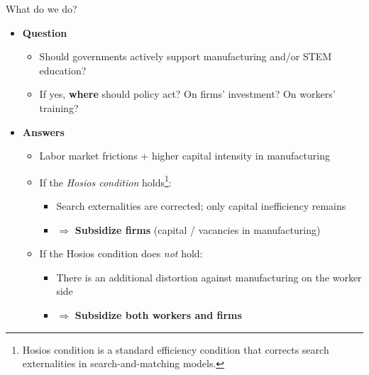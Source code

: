 \documentclass[9pt,xcolor={svgnames}]{beamer}
\begin{document}
\begin{frame}{What do we do?}
\begin{itemize}
  \item \textbf{Question}
  \begin{itemize}
      \item Should governments actively support manufacturing and/or STEM education?
      \item If yes, \textbf{where} should policy act? On firms’ investment? On workers’ training?
  \end{itemize}
  \vspace{2em}
  \item \textbf{Answers}
    \begin{itemize}
      \item Labor market frictions + higher capital intensity in manufacturing 
      \item If the \textit{Hosios condition} holds\footnote{Hosios condition is a standard efficiency condition that corrects search externalities in search-and-matching models.}:
      \begin{itemize}
          \item Search externalities are corrected; only capital inefficiency remains
          \item $\Rightarrow$ \textbf{Subsidize firms} (capital / vacancies in manufacturing)
      \end{itemize}
      \item If the Hosios condition does \textit{not} hold:
        \begin{itemize}
          \item There is an additional distortion against manufacturing on the worker side
          \item $\Rightarrow$ \textbf{Subsidize both workers and firms}
      \end{itemize}
    \end{itemize}
\end{itemize}
\end{frame}


\end{document}
